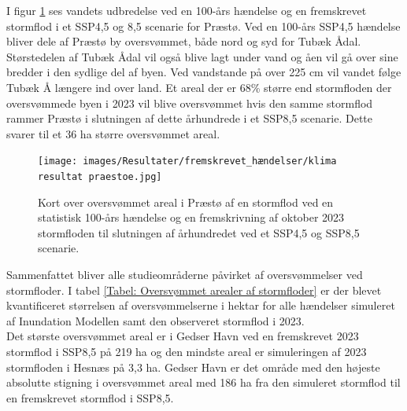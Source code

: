 I figur \ref{Figur: Klima Præstø} ses vandets udbredelse ved en 100-års hændelse og en fremskrevet stormflod i et SSP4,5 og 8,5 scenarie for Præstø. Ved en 100-års SSP4,5 hændelse bliver dele af Præstø by oversvømmet, både nord og syd for Tubæk Ådal. Størstedelen af Tubæk Ådal vil også blive lagt under vand og åen vil gå over sine bredder i den sydlige del af byen. Ved vandstande på over 225 cm vil vandet følge Tubæk Å længere ind over land. Et areal der er 68\% større end stormfloden der oversvømmede byen i 2023 vil blive oversvømmet hvis den samme stormflod rammer Præstø i slutningen af dette århundrede i et SSP8,5 scenarie. Dette svarer til et 36 ha større oversvømmet areal.
\begin{figure}[H]
    \centering
    \texttt{[image: images/Resultater/fremskrevet\_hændelser/klima resultat praestoe.jpg]}
    \caption{Kort over oversvømmet areal i Præstø af en stormflod ved en statistisk 100-års hændelse og en fremskrivning af oktober 2023 stormfloden til slutningen af århundredet ved et SSP4,5 og SSP8,5 scenarie.}
    \label{Figur: Klima Præstø}
\end{figure}
Sammenfattet bliver alle studieområderne påvirket af oversvømmelser ved stormfloder. I tabel \ref{Tabel: Oversvømmet arealer af stormfloder} er der blevet kvantificeret størrelsen af oversvømmelserne i hektar for alle hændelser simuleret af Inundation Modellen samt den observeret stormflod i 2023.\\ 
Det største oversvømmet areal er i Gedser Havn ved en fremskrevet 2023 stormflod i SSP8,5 på 219 ha og den mindste areal er simuleringen af 2023 stormfloden i Hesnæs på 3,3 ha. Gedser Havn er det område med den højeste absolutte stigning i oversvømmet areal med 186 ha fra den simuleret stormflod til en fremskrevet stormflod i SSP8,5. 
